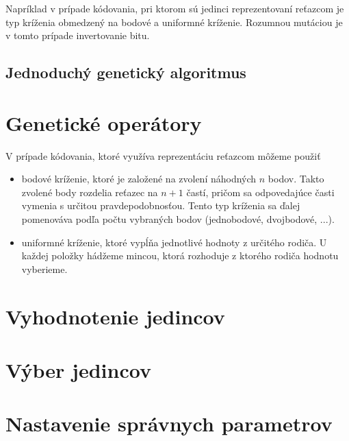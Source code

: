 Napríklad v prípade kódovania, pri ktorom sú jedinci reprezentovaní reťazcom je typ kríženia obmedzený na bodové a uniformné kríženie. Rozumnou mutáciou je v tomto prípade invertovanie bitu.

\subsection{Jednoduchý genetický algoritmus}

\section{Genetické operátory}\label{kap2:2.2:Operators}
V prípade kódovania, ktoré využíva reprezentáciu reťazcom môžeme použiť
\begin{itemize}
\item bodové kríženie, ktoré je založené na zvolení náhodných $n$ bodov. Takto zvolené body rozdelia reťazec na $n+1$ častí, pričom sa odpovedajúce časti vymenia s určitou pravdepodobnosťou. Tento typ kríženia sa ďalej pomenováva podľa počtu vybraných bodov (jednobodové, dvojbodové, ...).
\item uniformné kríženie, ktoré vypĺňa jednotlivé hodnoty z určitého rodiča. U každej položky hádžeme mincou, ktorá rozhoduje z ktorého rodiča hodnotu vyberieme.
\end{itemize}

\section{Vyhodnotenie jedincov}\label{kap2:2.3:Fitnesses}

\section{Výber jedincov}\label{kap2:2.4:Selection}

\section{Nastavenie správnych parametrov}\label{kap2:2.5:Parameters}

